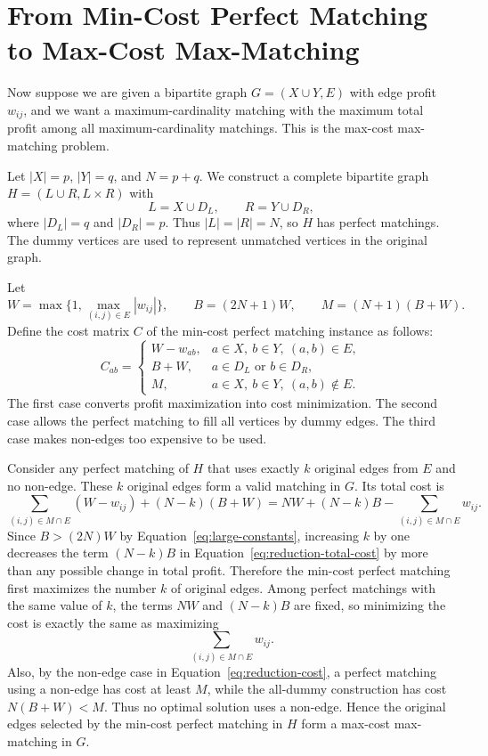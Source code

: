 \documentclass[acmsmall,nonacm]{acmart}
\theoremstyle{plain}
\theoremstyle{remark}
\begin{document}
\section{From Min-Cost Perfect Matching to Max-Cost Max-Matching} 
\label{sec:reduction}

Now suppose we are given a bipartite graph $G=(X\cup Y,E)$ with edge profit
$w_{ij}$, and we want a maximum-cardinality matching with the maximum total
profit among all maximum-cardinality matchings. This is the max-cost
max-matching problem.

Let $|X|=p$, $|Y|=q$, and $N=p+q$. We construct a complete bipartite graph
$H=(L\cup R,L\times R)$ with
\begin{equation}
    \label{eq:dummy-sets}
    L = X \cup D_L,\qquad R = Y \cup D_R,
\end{equation}
where $|D_L|=q$ and $|D_R|=p$. Thus $|L|=|R|=N$, so $H$ has perfect matchings.
The dummy vertices are used to represent unmatched vertices in the original
graph.

Let
\begin{equation}
    \label{eq:large-constants}
    W=\max\{1,\max_{(i,j)\in E}|w_{ij}|\},\qquad
    B=(2N+1)W,\qquad
    M=(N+1)(B+W).
\end{equation}
Define the cost matrix $C$ of the min-cost perfect matching instance as follows:
\begin{equation}
    \label{eq:reduction-cost}
C_{ab} =
\begin{cases}
    W-w_{ab}, & a\in X,\ b\in Y,\ (a,b)\in E,\\
    B+W, & a\in D_L \text{ or } b\in D_R,\\
    M, & a\in X,\ b\in Y,\ (a,b)\notin E.
\end{cases}
\end{equation}
The first case converts profit maximization into cost minimization. The second
case allows the perfect matching to fill all vertices by dummy edges. The third
case makes non-edges too expensive to be used.

Consider any perfect matching of $H$ that uses exactly $k$ original edges from
$E$ and no non-edge. These $k$ original edges form a valid matching in $G$.
Its total cost is
\begin{equation}
    \label{eq:reduction-total-cost}
    \sum_{(i,j)\in M\cap E}(W-w_{ij}) + (N-k)(B+W)
    =
    NW + (N-k)B - \sum_{(i,j)\in M\cap E} w_{ij}.
\end{equation}
Since $B>(2N)W$ by Equation~\ref{eq:large-constants}, increasing $k$ by one
decreases the term $(N-k)B$ in Equation~\ref{eq:reduction-total-cost} by more
than any possible change in total profit. Therefore the min-cost perfect
matching first maximizes the number $k$ of original edges. Among perfect
matchings with the same value of $k$, the terms $NW$ and $(N-k)B$ are fixed, so
minimizing the cost is exactly the same as maximizing
\[
    \sum_{(i,j)\in M\cap E} w_{ij}.
\]
Also, by the non-edge case in Equation~\ref{eq:reduction-cost}, a perfect
matching using a non-edge has cost at least $M$, while the all-dummy construction
has cost $N(B+W)<M$. Thus no optimal solution uses a non-edge. Hence the
original edges selected by the min-cost perfect matching in $H$ form a max-cost
max-matching in $G$.
\end{document}
